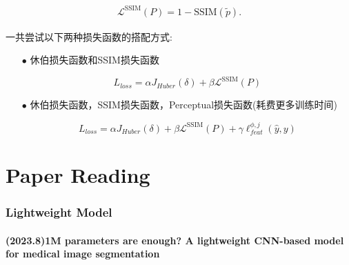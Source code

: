 \documentclass[a4paper, 10pt]{article}
\begin{document}
		\begin{equation}
			\begin{aligned}
				\mathcal{L}^{\text{SSIM}}(P)=1-\text{SSIM}(\tilde{p}).
			\end{aligned}
			\label{eq: revised_SSIM loss}
		\end{equation}
		
		
		一共尝试以下两种损失函数的搭配方式:
		
		\begin{itemize}
			\item[$\bullet$]
			休伯损失函数和SSIM损失函数
			
			\begin{equation}
				L_{loss} = \alpha J_{Huber}(\delta) + \beta \mathcal{L}^{\text{SSIM}}(P)
			\end{equation}
			
			\item[$\bullet$]
			休伯损失函数，SSIM损失函数，Perceptual损失函数(耗费更多训练时间)
			
			\begin{equation}
				L_{loss} = \alpha J_{Huber}(\delta) + \beta \mathcal{L}^{\text{SSIM}}(P) + \gamma \ell_{feat}^{\phi,j} (\hat{y},y)
			\end{equation}
		\end{itemize}
		

	
	\part{Paper Reading}
	
	\section{Lightweight Model}
		
		\subsection{(2023.8)1M parameters are enough? A lightweight CNN-based model for medical image segmentation}
		
\end{document}
